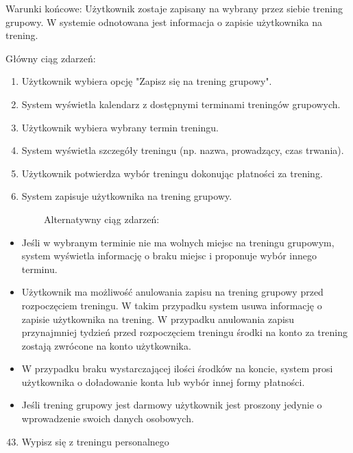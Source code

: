 {Warunki końcowe: Użytkownik zostaje zapisany na wybrany przez siebie
trening grupowy. W systemie odnotowana jest informacja o zapisie
użytkownika na trening.}

{Główny ciąg zdarzeń:}

\begin{enumerate}
\tightlist
\item
  {Użytkownik wybiera opcję "Zapisz się na trening grupowy".}
\item
  {System wyświetla kalendarz z dostępnymi terminami treningów
  grupowych.}
\item
  {Użytkownik wybiera wybrany termin treningu.}
\item
  {System wyświetla szczegóły treningu (np. nazwa, prowadzący, czas
  trwania).}
\item
  {Użytkownik potwierdza wybór treningu dokonując płatności za trening.}
\item
  {System zapisuje użytkownika na trening grupowy.}
\end{enumerate}

{~~~~~~~~Alternatywny ciąg zdarzeń:}

\begin{itemize}
\tightlist
\item
  {Jeśli w wybranym terminie nie ma wolnych miejsc na treningu grupowym,
  system wyświetla informację o braku miejsc i proponuje wybór innego
  terminu.}
\item
  {Użytkownik ma możliwość anulowania zapisu na trening grupowy przed
  rozpoczęciem treningu. W takim przypadku system usuwa informację o
  zapisie użytkownika na trening. W przypadku anulowania zapisu
  przynajmniej tydzień przed rozpoczęciem treningu środki na konto za
  trening zostają zwrócone na konto użytkownika.}
\item
  {W przypadku braku wystarczającej ilości środków na koncie, system
  prosi użytkownika o doładowanie konta lub wybór innej formy
  płatności.}
\item
  {Jeśli trening grupowy jest darmowy użytkownik jest proszony jedynie o
  wprowadzenie swoich danych osobowych.\\
  }
\end{itemize}

{}

\begin{enumerate}
\setcounter{enumi}{42}
\tightlist
\item
  {Wypisz się z treningu personalnego}
\end{enumerate}

